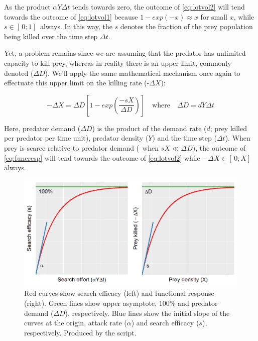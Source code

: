 As the product $\alpha Y \Delta t$ tends towards zero, the outcome of \eqref{eq:lotvol2} will tend towards the outcome of \eqref{eq:lotvol1} because $1-exp(-x)\approx x$ for small $x$, while $s\in[\,0;1]\,$ always. In this way, the  $s$ denotes the fraction of the prey population being killed over the time step $\Delta t$.

Yet, a problem remains since we are assuming that the predator has unlimited capacity to kill prey, whereas in reality there is an upper limit, commonly denoted  ($\Delta D$). We'll apply the same mathematical mechanism once again to effectuate this upper limit on the killing rate (-$\Delta X$):

\begin{equation}
-\Delta X = \Delta D \left[1-exp\left(\frac{-sX}{\Delta D}\right)\right] \quad\text{where}\quad \Delta D = dY\Delta t\label{eq:funcresp}
\end{equation}

Here, predator demand ($\Delta D$) is the product of the demand rate ($d$; prey killed per predator per time unit), predator density ($Y$) and the time step ($\Delta t$). When prey is scarce relative to predator demand (\ie\ when $sX \ll \Delta D$), the outcome of \eqref{eq:funcresp} will tend towards the outcome of \eqref{eq:lotvol2} while $-\Delta X\in[\,0;X]\,$ always.

\begin{figure} [ht]
\centering
\includegraphics[width=\textwidth]{graphics/func-resp-gb-detail}
\caption{Red curves show search efficacy (left) and functional response (right). Green lines show upper asymptote, 100\% and predator demand ($\Delta D$), respectively. Blue lines show the initial slope of the curves at the origin, attack rate ($\alpha$) and search efficacy ($s$), respectively. Produced by the  script.}
\label{fig:trophic}
\end{figure}

